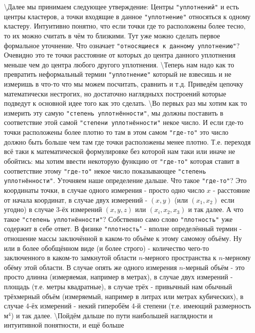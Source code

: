 \documentclass[11pt]{article}
\begin{document}
    \textbackslash{}Далее мы принимаем следующее утверждение: Центры
\verb'"уплотнений"' и есть центры кластеров, а точки входящие в данное
\verb'"уплотнение"' относяться к одному кластеру. Интуитивно понятно,
что если точки где то расположены более тесно, то их можно считать в чём
то близкими. Тут уже можно сделать первое формальное уточнение. Что
означает \verb'"относящиеся к данному уплотнению"'? Очевидно это те
точки расстояние от которых до центра данного уплотнения меньше чем до
центра любого другого уплотнения. \textbackslash{}Теперь нам надо как то
превратить неформальный термин \verb'"уплотнение"' который не взвесишь и
не измеришь в что-то что мы можем посчитать, сравнить и т.д. Приведём
цепочку математически нестрогих, но достаточно наглядныхх построений
которые подведут к основной идее того как это сделать.
\textbackslash{}Во первых раз мы хотим как то измерить эту самую
\verb'"степень уплотнённости"', мы должны поставить в соответствие этой
самой \verb'"степени уплотнённости"' некое число. И если где-то точки
расположены более плотно то там в этом самом \verb'"где-то"' это число
должно быть больше чем там где точки расположены менее плотно. Т.е.
переходя всё таки к математической формулировке без которой нам таки или
иначе не обойтись: мы хотим ввести некоторую функцию от \verb'"где-то"'
которая ставит в соответствие этому \verb'"где-то"' некое число
показывающее \verb'"степень уплотнённости"'. Уточняем наше определение
дальше. Что такое \verb'"где-то"'? Это координаты точки, в случае одного
измерения - просто одно число $x$ - расстояние от начала координат, в
случае двух измерений - $(x, y)$ (или $(x_1, x_2)$ если угодно) в случае
3-ёх измерений $(x, y, z)$ или $(x_i, x_2, x_3)$ и так далее. А что
такое \verb'"степень уплотнённости"'? Собственно само слово
\verb'"плотность"' уже содержит в себе ответ. В физике
\verb'"плотность'" - вполне определённый термин - отношение массы
заключённой в каком-то объёме к этому самомоу объёму. Ну или в более
обобщённом виде (и более строго) - количество чего-то заключенного в
каком-то замкнутой области $n$-мерного пространства к $n$-мерному обёму
этой области. В случае опять же одного измерения $n$-мерный объём - это
просто длинна (измеряемая, например в метрах), в случае двух измерений -
площадь (т.е. метры квадратные), в случае трёх - привычный нам обычный
трёхмерный объём (измеряемый, например в литрах или метрах кубических),
в случае 4-ёх измерений - некий гиперобём 4-й степени (т.е. имеющий
размерность ${\mbox{м}}^4$) и так далее. \textbackslash{}Пойдём дальше
по пути наибольшей наглядности и интуитивной понятности, и ещё больше
\end{document}
